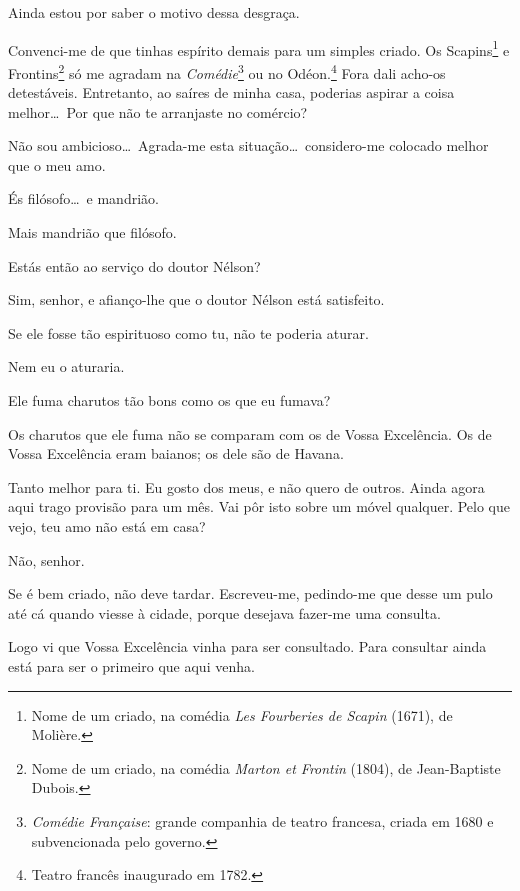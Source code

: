   Ainda estou por saber o motivo dessa desgraça.

  Convenci{}-me de que tinhas espírito demais para um
simples criado. Os Scapins\footnote{ Nome de um criado, na comédia \textit{Les Fourberies de Scapin} (1671), de Molière.} 
e Frontins\footnote{ Nome de um criado, na comédia \textit{Marton et Frontin} (1804), de Jean{}-Baptiste Dubois.} 
só me agradam na \textit{Comédie}\footnote{ \textit{Comédie Française}: 
grande companhia de teatro francesa, criada em 1680 e subvencionada pelo governo.}
ou no Odéon.\footnote{
Teatro francês inaugurado em 1782.}
Fora dali acho{}-os detestáveis. Entretanto, ao saíres de
minha casa, poderias aspirar a coisa melhor\ldots\ Por que não te
arranjaste no comércio?

  Não sou ambicioso\ldots\ Agrada{}-me esta situação\ldots\ considero{}-me
colocado melhor que o meu amo.

  És filósofo\ldots\ e mandrião.

  Mais mandrião que filósofo.

  Estás então ao serviço do doutor Nélson?

  Sim, senhor, e afianço{}-lhe que o doutor Nélson está satisfeito.

  Se ele fosse tão espirituoso como tu, não te
poderia aturar.

  Nem eu o aturaria.

  Ele fuma charutos tão bons como os que eu fumava?

  Os charutos que ele fuma não se comparam com os de Vossa
Excelência. Os de Vossa Excelência eram baianos; os dele são de Havana.

  Tanto melhor para ti. Eu gosto dos meus, e não
quero de outros.  Ainda agora aqui trago
provisão para um mês.  Vai pôr isto sobre um
móvel qualquer.  Pelo que vejo, teu amo não está em casa?

  Não, senhor.

  Se é bem criado, não deve tardar. Escreveu{}-me,
pedindo{}-me que desse um pulo até cá quando viesse à cidade, porque
desejava fazer{}-me uma consulta.

  Logo vi que Vossa Excelência vinha para ser consultado.
Para consultar ainda está para ser o primeiro que aqui venha.

